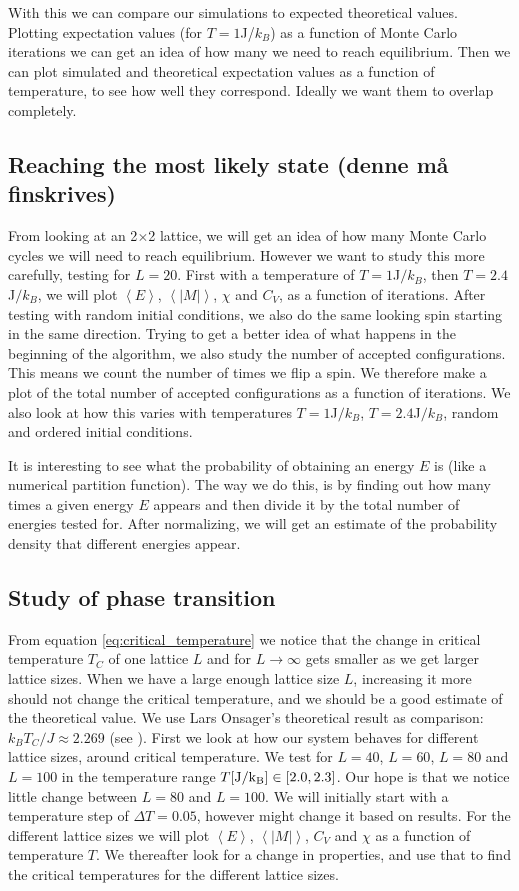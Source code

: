 \documentclass[reprint, english,notitlepage,nofootinbib]{revtex4-1}  %
\begin{document}
With this we can compare our simulations to expected theoretical values. Plotting expectation values (for $T=1$J/$k_B$) as a function of Monte Carlo iterations we can get an idea of how many we need to reach equilibrium. Then we can plot simulated and theoretical expectation values as a function of temperature, to see how well they correspond. Ideally we want them to overlap completely.

\subsection{Reaching the most likely state (denne må finskrives)}
From looking at an 2$\times$2 lattice, we will get an idea of how many Monte Carlo cycles we will need to reach equilibrium. However we want to study this more carefully, testing for $L=20$. First with a temperature of $T = 1 $J$/k_B$, then $T = 2.4 $J$/k_B$, we will plot $\left<E\right>$, $\left<|M|\right>$, $\chi$ and $C_V$, as a function of iterations. After testing with random initial conditions, we also do the same looking spin starting in the same direction. Trying to get a better idea of what happens in the beginning of the algorithm, we also study the number of accepted configurations. This means we count the number of times we flip a spin. We therefore make a plot of the total number of accepted configurations as a function of iterations. We also look at how this varies with temperatures $T = 1$J$/k_B$, $T=2.4$J$/k_B$, random and ordered initial conditions.

It is interesting to see what the probability of obtaining an energy $E$ is (like a numerical partition function). The way we do this, is by finding out how many times a given energy $E$ appears and then divide it by the total number of energies tested for. After normalizing, we will get an estimate of the probability density that different energies appear.

\subsection{Study of phase transition}

From equation \eqref{eq:critical_temperature} we notice that the change in critical temperature $T_C$ of one lattice $L$ and for $L\rightarrow\infty$ gets smaller as we get larger lattice sizes. When we have a large enough lattice size $L$, increasing it more should not change the critical temperature, and we should be a good estimate of the theoretical value. We use Lars Onsager's theoretical result as comparison: $k_BT_C/J \approx 2.269$ (see \cite{larsonsager}). First we look at how our system behaves for different lattice sizes, around critical temperature. We test for $L=40$, $L=60$, $L=80$ and $L=100$ in the temperature range $T[\rm{J}/k_B]\in [2.0, 2.3]$. Our hope is that we notice little change between $L=80$ and $L=100$. We will initially start with a temperature step of $\Delta T = 0.05$, however might change it based on results. For the different lattice sizes we will plot $\left<E\right>$, $\left<|M|\right>$, $C_V$ and $\chi$ as a function of temperature $T$. We thereafter look for a change in properties, and use that to find the critical temperatures for the different lattice sizes.
\end{document}
